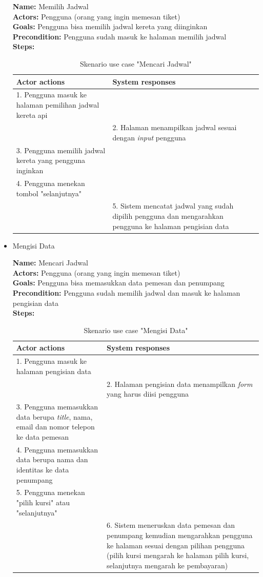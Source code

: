 \begin{itemize}
	\textbf{Name: }Memilih Jadwal\\
	\textbf{Actors: }Pengguna (orang yang ingin memesan tiket)\\
	\textbf{Goals: }Pengguna bisa memilih jadwal kereta yang diinginkan\\
	\textbf{Precondition: }Pengguna sudah masuk ke halaman memilih jadwal\\
	\textbf{Steps: }
	\begin{table}[H]
		\centering
		\caption{Skenario use case "Mencari Jadwal"}
		\label{tab:usecase2} 
		\begin{tabular}{|p{7cm}|p{7cm}|}
			\hline
			\textbf{Actor actions} & \textbf{System responses} \\ \hline
			1. Pengguna masuk ke halaman pemilihan jadwal kereta api & \\
			  & 2. Halaman menampilkan jadwal sesuai dengan \textit{input} pengguna \\
			3. Pengguna memilih jadwal kereta yang pengguna inginkan &\\ 
			4. Pengguna menekan tombol "selanjutnya" & \\
			  & 5. Sistem mencatat jadwal yang sudah dipilih pengguna dan mengarahkan pengguna ke halaman pengisian data\\
			\hline
		\end{tabular}
	\end{table}	
	
	\item Mengisi Data
	
	\textbf{Name: }Mencari Jadwal\\
	\textbf{Actors: }Pengguna (orang yang ingin memesan tiket)\\
	\textbf{Goals: }Pengguna bisa memasukkan data pemesan dan penumpang\\
	\textbf{Precondition: }Pengguna sudah memilih jadwal dan masuk ke halaman pengisian data\\
	\textbf{Steps: }
	\begin{table}[H]
		\centering
		\caption{Skenario use case "Mengisi Data"}
		\label{tab:usecase3} 
		\begin{tabular}{|p{7cm}|p{7cm}|}
			\hline
			\textbf{Actor actions} & \textbf{System responses} \\ \hline
			1. Pengguna masuk ke halaman pengisian data & \\
			  & 2. Halaman pengisian data menampilkan \textit{form} yang harus diisi pengguna \\
			3. Pengguna memasukkan data berupa \textit{title}, nama, email dan nomor telepon ke data pemesan & \\ 
			4. Pengguna memasukkan data berupa nama dan identitas ke data penumpang & \\
			5. Pengguna menekan "pilih kursi" atau "selanjutnya" & \\
			  & 6. Sistem meneruskan data pemesan dan penumpang kemudian mengarahkan pengguna ke halaman sesuai dengan pilihan pengguna (pilih kursi mengarah ke halaman pilih kursi, selanjutnya mengarah ke pembayaran)\\
			\hline
		\end{tabular}
	\end{table}	
	

\end{itemize}
